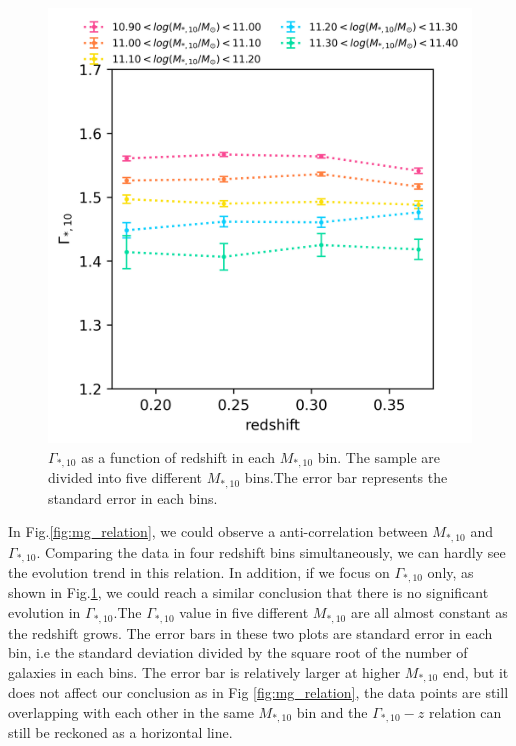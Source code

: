 \documentclass[fleqn,usenatbib]{mnras}
\begin{document}
\begin{figure}
    \centering
    \includegraphics[width=\linewidth]{figure/gamma.png}
    \caption{$\Gamma_{*,10}$ as a function of redshift in each $M_{*,10} $ bin. The sample are divided into five different $M_{*,10}$ bins.The error bar represents the standard error in each bins.}
    \label{fig:gamma}
\end{figure}
\par In Fig.\ref{fig:mg_relation}, we could observe a anti-correlation between $M_{*,10}$ and $\Gamma_{*,10}$. Comparing the data in four redshift bins simultaneously, we can hardly see the evolution trend in this relation. In addition, if we focus on $\Gamma_{*,10}$ only, as shown in Fig.\ref{fig:gamma}, we could reach a similar conclusion that there is no significant evolution in $\Gamma_{*,10}$.The $\Gamma_{*,10}$ value in five different $M_{*,10}$ are all almost constant as the redshift grows. The error bars in these two plots are standard error in each bin, i.e the standard deviation divided by the square root of the number of galaxies in each bins. The error bar is relatively larger at higher $M_{*,10}$ end, but it does not affect our conclusion as in Fig \ref{fig:mg_relation}, the data points are still overlapping with each other in the same $M_{*,10}$ bin and the $\Gamma_{*,10} - z$ relation can still be reckoned as a horizontal line. 
\end{document}
